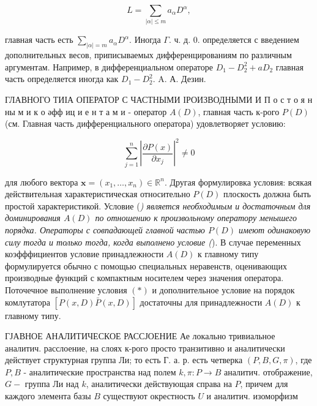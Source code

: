 \documentclass[10pt]{article}
\begin{document}
\[

L=\sum_{|\alpha| \leqslant m} a_{\alpha} D^{\alpha},

\]



главная часть есть $\sum_{|\alpha|=m} a_{\alpha} D^{\alpha}$. Иногда $\Gamma$. ч. д. 0. определяется с введением дополнительных весов, приписываемых дифференцированиям по различным аргументам. Например, в дифференциальном операторе $D_{1}-D_{2}^{2}+a D_{2}$ главная часть определяется иногда как $D_{1}-D_{2}^{2}$. A. А. Дезин.



ГЛАВНОГО ТИІА ОПЕРАТОР С ЧАСТНЫМИ ІРОИЗВОДНЫМИ И П о с т о я н ны м и к о әфф иц и е н т а м и - оператор $A(D)$, главная часть к-рого $P(D)$ (см. Главная часть дифференциального оператора) удовлетворяет условию:



\[

\sum_{j=1}^{n}\left|\frac{\partial P(x)}{\partial x_{j}}\right|^{2} \neq 0

\]



для любого вектора $\boldsymbol{x}=\left(x_{1}, \ldots, x_{n}\right) \in \mathbb{R}^{n}$. Другая формулировка условия: всякая действительная характеристическая относительно $P(D)$ плоскость должна быть простой характеристикой. Условие (\textit{) является необходимым и достаточным для доминирования $A(D)$ по отношению к произвольному оператору менышего порядка. Операторы с совпадающей главной частью $P(D)$ имеют одинаковую силу тогда и только тогда, когда выполнено условие (}). В случае переменных коэфффициентов условие принадлежности $A(D)$ к главному типу формулируется обычно с помощью специальных неравенств, оценивающих производные функций с компактным носителем через значения оператора. Поточечное выполнение условия $(*)$ и дополнительное условие на порядок комлутатора $[P(x, D) \bar{P}(x, D)]$ достаточны для принадлежности $A(D)$ к главному типу.



ГЈАВНОЕ АНАЛИТИЧЕСКОЕ РАССЈОЕНИЕ Ае локально тривиальное аналитич. расслоение, на слоях к-рого просто транзитивно и аналитически действует структурная группа Ли; то есть Г. а. р. есть четверка $(P, B, G, \pi)$, где $P, B$ - аналитические пространства над полем $k, \pi: P \rightarrow B$ аналитич. отображение, $G-$ группа Ли над $k$, аналитически действующая справа на $P$, причем для каждого элемента базы $B$ существуют окрестность $U$ и аналитич. изоморфизм
\end{document}
